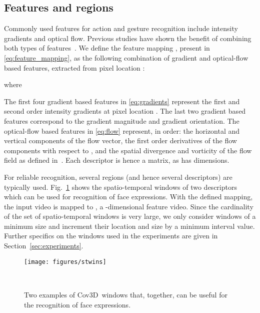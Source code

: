 \documentclass[10pt,twocolumn,letterpaper]{article}
\newcommand{\fig}[1]{\mbox{Fig.~\ref{#1}}}
\newcommand{\eqsize}{\footnotesize}
\newcommand{\cov}{{Cov3D}}
\begin{document}
\subsection{Features and regions}
\label{sec:features}
\vspace{-1ex}

Commonly used features for action and gesture recognition include intensity gradients and optical flow.
Previous studies have shown the benefit of combining both types of features~\cite{DollarEtAl2005,WangEtAl2009}.
We define the feature mapping {\eqsize },
present in \eqref{eq:feature_mapping},
as the following combination of gradient and optical-flow based features,
extracted from pixel location {\eqsize }:

\vspace{-1ex}
\eqsize

\normalsize

\noindent
where
\vspace{-2ex}

\noindent
\eqsize

\normalsize

The first four gradient based features in \eqref{eq:gradients} represent the first and second order intensity gradients at pixel location {\eqsize
}. The last two gradient based features correspond to the gradient magnitude and gradient orientation. The optical-flow based features in
\eqref{eq:flow} represent, in order: the horizontal and vertical components of the flow vector,
the first order derivatives of the flow components with respect to {\eqsize },
and the spatial divergence and vorticity of the flow field as defined in~\cite{AliAndShah2010}.
Each descriptor is hence a {\eqsize } matrix, as {\eqsize } has {\eqsize } dimensions.

For reliable recognition, several regions (and hence several descriptors) are typically used.
\fig{fig:stwins} shows the spatio-temporal windows of two descriptors which can be used for recognition of face expressions.
With the defined mapping, the input video {\small } is mapped to {\small }, a {\small }-dimensional feature video.
Since the cardinality of the set of spatio-temporal windows {\eqsize } is very large,
we only consider windows of a minimum size and increment their location and size by a minimum interval value.
Further specifics on the windows used in the experiments are given in Section~\ref{sec:experiments}.

\begin{figure}[!b]
  \centering
  \begin{minipage}{1\columnwidth}
    \begin{minipage}{0.4\columnwidth}
      \texttt{[image: figures/stwins]}
    \end{minipage}
    \hfill
    \begin{minipage}{0.55\columnwidth}
      \caption
        {
        \small
        Two examples of \cov~windows that, together, can be useful for the recognition of face expressions.
        }
      \label{fig:stwins}
      ~
    \end{minipage}
  \end{minipage}
\end{figure}
\end{document}
